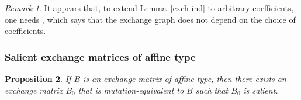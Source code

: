 \documentclass{amsart}
\newtheorem{proposition}{Proposition}[section]
\theoremstyle{definition}
\theoremstyle{remark}
\newtheorem{remark}[proposition]{Remark}
\numberwithin{equation}{section}
\newcommand{\0}{{\mathbf{0}}}
\begin{document}
\begin{remark}\label{4.3}
It appears that, to extend Lemma~\ref{exch ind} to arbitrary coefficients, one needs \cite[Conjecture~4.3]{ca4}, which says that the exchange graph does not depend on the choice of coefficients.
\end{remark}

\subsubsection{Salient exchange matrices of affine type}
\begin{proposition}\label{affine salient}
If $B$ is an exchange matrix of affine type, then there exists an exchange matrix $B_0$ that is mutation-equivalent to $B$ such that $B_0$ is salient.
\end{proposition}
\end{document}
